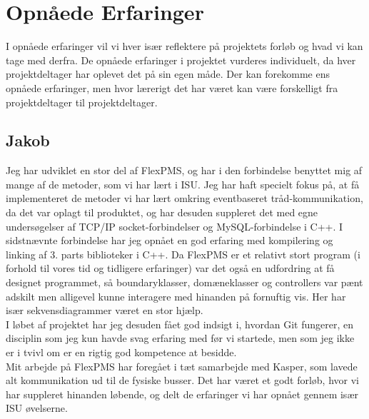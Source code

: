 \section{Opnåede Erfaringer}
I opnåede erfaringer vil vi hver især reflektere på projektets forløb og hvad vi kan tage med derfra. De opnåede erfaringer i projektet vurderes individuelt, da hver projektdeltager har oplevet det på sin egen måde. Der kan forekomme ens opnåede erfaringer, men hvor lærerigt det har været kan være forskelligt fra projektdeltager til projektdeltager.

\subsection{Jakob}
Jeg har udviklet en stor del af FlexPMS, og har i den forbindelse benyttet mig af mange af de metoder, som vi har lært i ISU. Jeg har haft specielt fokus på, at få implementeret de metoder vi har lært omkring eventbaseret tråd-kommunikation, da det var oplagt til produktet, og har desuden suppleret det med egne undersøgelser af TCP/IP socket-forbindelser og MySQL-forbindelse i C++. I sidstnævnte forbindelse har jeg opnået en god erfaring med kompilering og linking af 3. parts biblioteker i C++. Da FlexPMS er et relativt stort program (i forhold til vores tid og tidligere erfaringer) var det også en udfordring at få designet programmet, så boundaryklasser, domæneklasser og controllers var pænt adskilt men alligevel kunne interagere med hinanden på fornuftig vis. Her har især sekvensdiagrammer været en stor hjælp.\\
I løbet af projektet har jeg desuden fået god indsigt i, hvordan Git fungerer, en disciplin som jeg kun havde svag erfaring med før vi startede, men som jeg ikke er i tvivl om er en rigtig god kompetence at besidde.\\
Mit arbejde på FlexPMS har foregået i tæt samarbejde med Kasper, som lavede alt kommunikation ud til de fysiske busser. Det har været et godt forløb, hvor vi har suppleret hinanden løbende, og delt de erfaringer vi har opnået gennem især ISU øvelserne.


